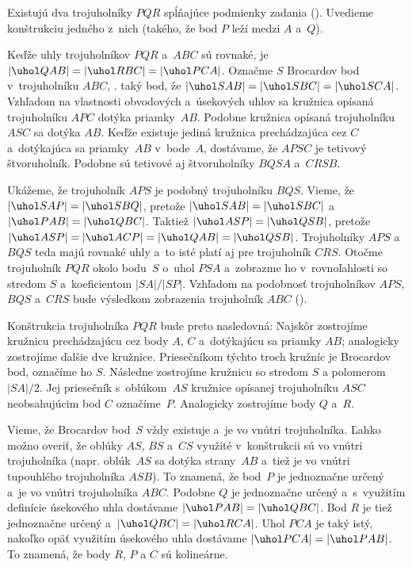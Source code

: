 {%
Existujú dva trojuholníky $PQR$ spĺňajúce podmienky zadania (\obr). Uvedieme konštrukciu jedného z~nich (takého, že bod $P$ leží medzi $A$ a~$Q$).
%

Keďže uhly trojuholníkov $PQR$ a~$ABC$ sú rovnaké, je $|\uhol QAB| = |\uhol RBC| = |\uhol PCA|$. Označme $S$ Brocardov bod v~trojuholníku $ABC$, \tj. taký bod, že $|\uhol SAB| = |\uhol SBC| = |\uhol SCA|$. Vzhľadom na vlastnosti obvodových a~úsekových uhlov sa kružnica opísaná trojuholníku $APC$ dotýka priamky~$AB$. Podobne kružnica opísaná trojuholníku $ASC$ sa dotýka $AB$. Keďže existuje jediná kružnica prechádzajúca cez $C$ a~dotýkajúca sa priamky~$AB$ v~bode~$A$, dostávame, že $APSC$ je tetivový štvoruholník. Podobne sú tetivové aj štvoruholníky $BQSA$ a~$CRSB$.

Ukážeme, že trojuholník $APS$ je podobný trojuholníku $BQS$. Vieme, že  $|\uhol SAP| = |\uhol SBQ|$, pretože $|\uhol SAB| = |\uhol SBC|$ a~$|\uhol PAB| = |\uhol QBC|$. Taktiež $|\uhol ASP| = |\uhol QSB|$, pretože $|\uhol ASP| = |\uhol ACP| = |\uhol QAB| = |\uhol QSB|$. Trojuholníky $APS$ a~$BQS$ teda majú rovnaké uhly a~to isté platí aj pre trojuholník $CRS$. Otočme trojuholník $PQR$ okolo bodu~$S$ o~uhol $PSA$ a~zobrazme ho v~rovnoľahlosti so stredom $S$ a~koeficientom $|SA|/|SP|$. Vzhľadom na podobnosť trojuholníkov $APS$, $BQS$ a~$CRS$ bude výsledkom zobrazenia trojuholník $ABC$ (\obr).
%

Konštrukcia trojuholníka $PQR$ bude preto nasledovná: Najskôr zostrojíme kružnicu prechádzajúcu cez body $A$, $C$ a~dotýkajúcu sa priamky $AB$; analogicky zostrojíme ďalšie dve kružnice. Priesečníkom týchto troch kružníc je Brocardov bod, označíme ho $S$.
Následne zostrojíme kružnicu so stredom $S$ a polomerom $|SA|/2$. Jej priesečník s~oblúkom~$AS$ kružnice opísanej trojuholníku $ASC$ neobsahujúcim bod $C$ označíme~$P$. Analogicky zostrojíme body $Q$ a~$R$.


Vieme, že Brocardov bod~$S$ vždy existuje a~je vo vnútri trojuholníka. Ľahko možno overiť, že oblúky $AS$, $BS$ a~$CS$ využité v~konštrukcii sú vo vnútri trojuholníka (napr. oblúk~$AS$ sa dotýka strany~$AB$ a~tiež je vo vnútri tupouhlého trojuholníka $ASB$). To znamená, že bod~$P$ je jednoznačne určený a~je vo vnútri trojuholníka $ABC$. Podobne $Q$ je jednoznačne určený a~s~využitím definície úsekového uhla dostávame $|\uhol PAB| = |\uhol QBC|$. Bod $R$ je tiež jednoznačne určený a~$|\uhol QBC| = |\uhol RCA|$. Uhol $PCA$ je taký istý, nakoľko opäť využitím úsekového uhla dostávame $|\uhol PCA| = |\uhol PAB|$. To znamená, že body $R$, $P$ a $C$ sú kolineárne.}

